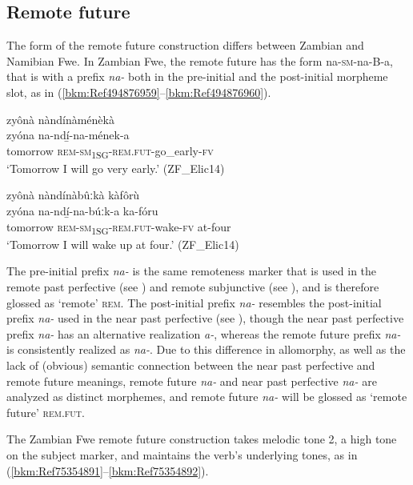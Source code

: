 \subsection{Remote future}
\label{bkm:Ref443303356}\label{bkm:Ref489268446}\hypertarget{Toc75352687}{}
The form of the remote future construction differs between Zambian and Namibian Fwe. In Zambian Fwe, the remote future has the form na-\textsc{sm}-na-B-a, that is with a prefix \textit{na-} both in the pre-initial and the post-initial morpheme slot, as in (\ref{bkm:Ref494876959}--\ref{bkm:Ref494876960}).

\ea
\label{bkm:Ref494876959}
zyônà nàndínàménèkà\\
\gll zyóna    na-ndí̲-na-mének-a\\
tomorrow  \textsc{rem}-\textsc{sm}\textsubscript{1SG}-\textsc{rem}.\textsc{fut}-go\_early-\textsc{fv}\\
\glt ‘Tomorrow I will go very early.’ (ZF\_Elic14)
\z

\ea
\label{bkm:Ref494876960}
zyônà nàndínàbûːkà kàfôrù\\
\gll zyóna    na-ndí̲-na-búːk-a      ka-fóru\\
tomorrow  \textsc{rem}-\textsc{sm}\textsubscript{1SG}-\textsc{rem}.\textsc{fut}-wake-\textsc{fv}  at-four\\
\glt ‘Tomorrow I will wake up at four.’ (ZF\_Elic14)
\z

The pre-initial prefix \textit{na-} is the same remoteness marker that is used in the remote past perfective (see ) and remote subjunctive (see ), and is therefore glossed as ‘remote’ \textsc{rem}. The post-initial prefix \textit{na-} resembles the post-initial prefix \textit{na-} used in the near past perfective (see ), though the near past perfective prefix \textit{na-} has an alternative realization \textit{a-}, whereas the remote future prefix \textit{na-} is consistently realized as \textit{na-}. Due to this difference in allomorphy, as well as the lack of (obvious) semantic connection between the near past perfective and remote future meanings, remote future \textit{na-} and near past perfective \textit{na-} are analyzed as distinct morphemes, and remote future \textit{na-} will be glossed as ‘remote future’ \textsc{rem}.\textsc{fut}.

The Zambian Fwe remote future construction takes melodic tone 2, a high tone on the subject marker, and maintains the verb’s underlying tones, as in (\ref{bkm:Ref75354891}--\ref{bkm:Ref75354892}).

